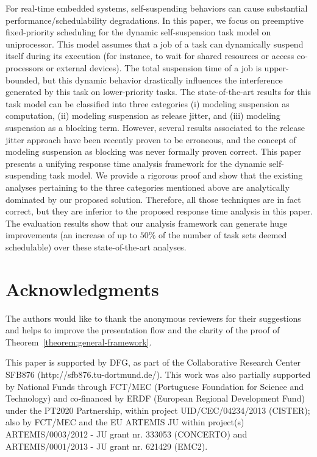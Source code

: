 \begingroup
\let\clearpage\relax
\let\cleardoublepage\relax
\let\cleardoublepage\relax

 For real-time embedded systems, self-suspending behaviors can cause
  substantial performance/schedulability degradations. In this paper,
  we focus on preemptive fixed-priority scheduling for the dynamic
  self-suspension task model on uniprocessor. This
  model assumes that a job of a task can dynamically suspend itself during its execution (for instance, to wait for shared resources or access co-processors or external devices).
  The total suspension time of a job is upper-bounded, but this dynamic behavior drastically influences the interference generated by this task on lower-priority tasks. The state-of-the-art results for this task model can be classified
  into three categories (i) modeling suspension as computation, (ii)
  modeling suspension as release jitter, and (iii) modeling suspension as a blocking term.
  However, several results associated to the release jitter approach have been recently proven to be erroneous, and the concept of modeling suspension as blocking was never
  formally proven correct. This paper presents a unifying
  response time analysis framework for the dynamic self-suspending
  task model. We provide a rigorous proof and show that the existing analyses pertaining to the three categories mentioned above are analytically dominated by our proposed solution. Therefore, all those techniques are in fact correct, but they are
  inferior to the proposed response time analysis in this paper. The
  evaluation results show that our analysis framework can generate huge
  improvements (an increase of up to $50\%$ of the number of task sets
  deemed schedulable) over these state-of-the-art analyses.

\vfill

\chapter*{Acknowledgments}
The authors would like to thank the anonymous reviewers for their suggestions and helps to improve the presentation flow and the clarity of the proof of Theorem~\ref{theorem:general-framework}. 

This paper is supported by DFG, as part of the Collaborative Research
Center SFB876 (http://sfb876.tu-dortmund.de/). This work was also
partially supported by National Funds through FCT/MEC (Portuguese
Foundation for Science and Technology) and co-financed by ERDF
(European Regional Development Fund) under the PT2020 Partnership,
within project UID/CEC/04234/2013 (CISTER); also by FCT/MEC and the EU
ARTEMIS JU within project(s) ARTEMIS/0003/2012 - JU grant nr. 333053
(CONCERTO) and ARTEMIS/0001/2013 - JU grant nr. 621429 (EMC2).

\endgroup			

\vfill
